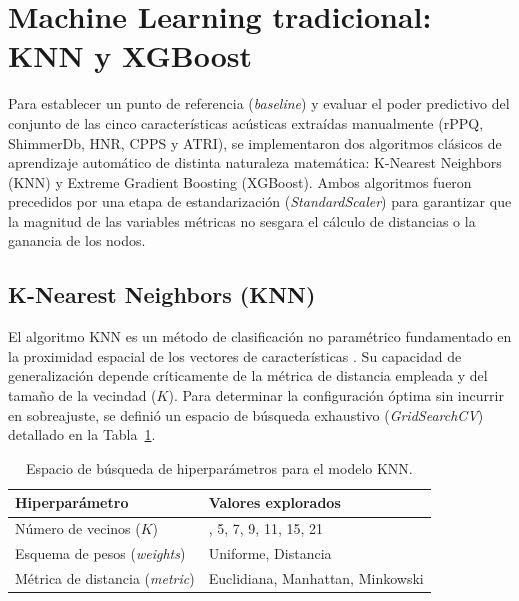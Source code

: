 \section{Machine Learning tradicional: KNN y XGBoost}\label{sec:ml_tradicional}

Para establecer un punto de referencia (\textit{baseline}) y evaluar el poder predictivo del conjunto de las cinco características acústicas extraídas manualmente (rPPQ, ShimmerDb, HNR, CPPS y ATRI), se implementaron dos algoritmos clásicos de aprendizaje automático de distinta naturaleza matemática: K-Nearest Neighbors (KNN) y Extreme Gradient Boosting (XGBoost). Ambos algoritmos fueron precedidos por una etapa de estandarización (\textit{StandardScaler}) \cite{pedregosa2012} para garantizar que la magnitud de las variables métricas no sesgara el cálculo de distancias o la ganancia de los nodos.

\subsection{K-Nearest Neighbors (KNN)}
El algoritmo KNN es un método de clasificación no paramétrico fundamentado en la proximidad espacial de los vectores de características \cite{cover1967}. Su capacidad de generalización depende críticamente de la métrica de distancia empleada y del tamaño de la vecindad ($K$). Para determinar la configuración óptima sin incurrir en sobreajuste, se definió un espacio de búsqueda exhaustivo (\textit{GridSearchCV}) \cite{pedregosa2012} detallado en la Tabla~\ref{tab:grid_knn}.

\begin{table}[H]
    
    \centering
    \renewcommand{\arraystretch}{1.2}
    \begin{tabularx}{0.8\textwidth}{>{\raggedright\arraybackslash}X >{\centering\arraybackslash}X}
        \toprule
        \textbf{Hiperparámetro} & \textbf{Valores explorados} \\
        \midrule
        Número de vecinos ($K$) & 3, 5, 7, 9, 11, 15, 21 \\
        Esquema de pesos (\textit{weights}) & Uniforme, Distancia \\
        Métrica de distancia (\textit{metric}) & Euclidiana, Manhattan, Minkowski \\
        \bottomrule
    \end{tabularx}
    \caption{Espacio de búsqueda de hiperparámetros para el modelo KNN.}
    \label{tab:grid_knn}
\end{table}


